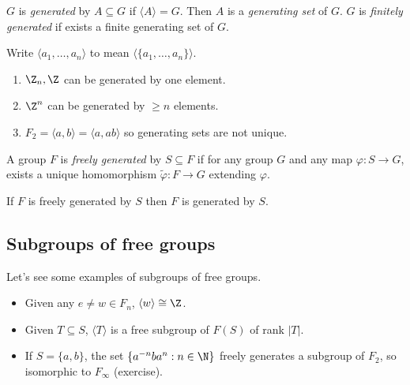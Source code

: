 \documentclass[a4paper]{article}
\begin{document}
\begin{definition}
  \(G\) is \emph{generated} by \(A \subseteq G\) if \(\langle A \rangle = G\). Then \(A\) is a \emph{generating set} of \(G\). \(G\) is \emph{finitely generated} if exists a finite generating set of \(G\).
\end{definition}

\begin{notation}
  Write \(\langle a_1, \dots, a_n \rangle\) to mean \(\langle \{a_1, \dots, a_n\} \rangle\).
\end{notation}

\begin{eg}\leavevmode
  \begin{enumerate}
  \item \(\Z_n, \Z\) can be generated by one element.
  \item \(\Z^n\) can be generated by \(\geq n\) elements.
  \item \(F_2 = \langle a, b \rangle = \langle a, ab \rangle\) so generating sets are not unique.
  \end{enumerate}
\end{eg}

\begin{definition}
  A group \(F\) is \emph{freely generated} by \(S \subseteq F\) if for any group \(G\) and any map \(\varphi: S \to G\), exists a unique homomorphism \(\tilde \varphi: F \to G\) extending \(\varphi\).
\end{definition}

\begin{lemma}
  If \(F\) is freely generated by \(S\) then \(F\) is generated by \(S\).
\end{lemma}

\subsection{Subgroups of free groups}

Let's see some examples of subgroups of free groups.

\begin{itemize}
\item Given any \(e \ne w \in F_n\), \(\langle w \rangle \cong \Z\).
\item Given \(T \subseteq S\), \(\langle T \rangle\) is a free subgroup of \(F(S)\) of rank \(|T|\).
\item If \(S = \{a, b\}\), the set \(\{a^{-n} ba^n: n \in \N\}\) freely generates a subgroup of \(F_2\), so isomorphic to \(F_\infty\) (exercise).
\end{itemize}
\end{document}
